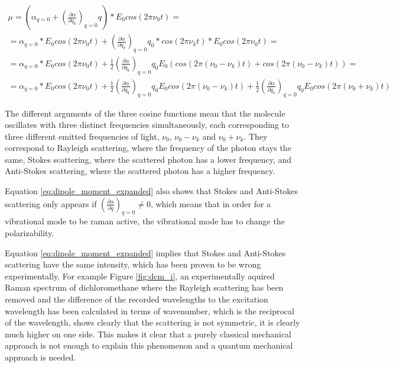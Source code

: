 \begin{multline} \label{eq:dipole_moment_expanded}
    \mu = (\alpha_{q=0} + \left( \frac{\partial\alpha}{\partial q_k}\right)_{q=0}q)*E_0cos(2\pi\nu_0t) = \\
    = \alpha_{q=0}*E_0cos(2\pi\nu_0t) +  \left( \frac{\partial\alpha}{\partial q_k}\right)_{q=0}q_0*cos(2\pi\nu_kt)*E_0cos(2\pi\nu_0t)=\\
    =\alpha_{q=0}*E_0cos(2\pi\nu_0t) + \frac{1}{2} \left( \frac{\partial\alpha}{\partial q_k}\right)_{q=0}q_0E_0\left(cos(2\pi(\nu_0-\nu_k)t)+cos(2\pi(\nu_0-\nu_k)t)\right)= \\
    =\alpha_{q=0}*E_0cos(2\pi\nu_0t)+\frac{1}{2} \left( \frac{\partial\alpha}{\partial q_k}\right)_{q=0}q_0E_0cos(2\pi(\nu_0-\nu_k)t) + \frac{1}{2} \left( \frac{\partial\alpha}{\partial q_k}\right)_{q=0}q_0E_0cos(2\pi(\nu_0+\nu_k)t)
\end{multline}

The different arguments of the three cosine functions mean that the molecule oscillates with three distinct frequencies simultaneously, each corresponding to three different emitted frequencies of light, \(\nu_0\), \(\nu_0-\nu_k\) and \(\nu_0+\nu_k\). They correspond to Rayleigh scattering, where the frequency of the photon stays the same, Stokes scattering, where the scattered photon has a lower frequency, and Anti-Stokes scattering, where the scattered photon has a higher frequency.

\bigskip

Equation \ref{eq:dipole_moment_expanded} also shows that Stokes and Anti-Stokes scattering only appears if \((\frac{\partial\alpha}{\partial q})_{q=0}\neq 0\), which means that in order for a vibrational mode to be raman active, the vibrational mode has to change the polarizability.

\bigskip

Equation \ref{eq:dipole_moment_expanded} implies that Stokes and Anti-Stokes scattering have the same intensity, which has been proven to be wrong experimentally. For example Figure \ref{fig:dcm_i}, an experimentally aquired Raman spectrum of dichloromethane where the Rayleigh scattering has been removed and the difference of the recorded wavelengths to the excitation wavelength has been calculated in terms of wavenumber, which is the reciprocal of the wavelength, shows clearly that the scattering is not symmetric, it is clearly much higher on one side. This makes it clear that a purely classical mechanical approach is not enough to explain this phenomenon and a quantum mechanical approach is needed. \cite{theory1} \cite{presentation}

